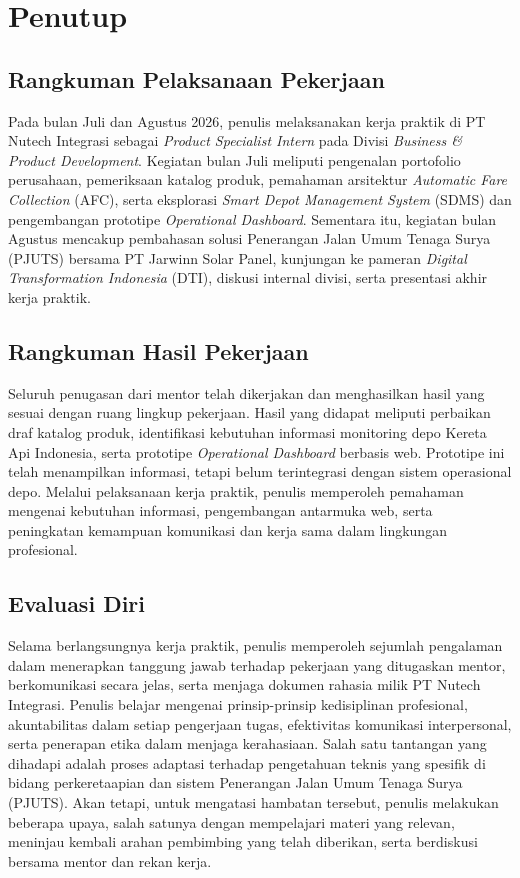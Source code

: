 \cleardoublepage
\chapter{Penutup}
\label{chap:penutup}

\section{Rangkuman Pelaksanaan Pekerjaan}
Pada bulan Juli dan Agustus 2026, penulis melaksanakan kerja praktik di PT Nutech Integrasi sebagai \textit{Product Specialist Intern} pada Divisi \textit{Business \& Product Development}. Kegiatan bulan Juli meliputi pengenalan portofolio perusahaan, pemeriksaan katalog produk, pemahaman arsitektur \textit{Automatic Fare Collection} (AFC), serta eksplorasi \textit{Smart Depot Management System} (SDMS) dan pengembangan prototipe \textit{Operational Dashboard}. Sementara itu, kegiatan bulan Agustus mencakup pembahasan solusi Penerangan Jalan Umum Tenaga Surya (PJUTS) bersama PT Jarwinn Solar Panel, kunjungan ke pameran \textit{Digital Transformation Indonesia} (DTI), diskusi internal divisi, serta presentasi akhir kerja praktik.

\section{Rangkuman Hasil Pekerjaan}
Seluruh penugasan dari mentor telah dikerjakan dan menghasilkan hasil yang sesuai dengan ruang lingkup pekerjaan. Hasil yang didapat meliputi perbaikan draf katalog produk, identifikasi kebutuhan informasi monitoring depo Kereta Api Indonesia, serta prototipe \textit{Operational Dashboard} berbasis web. Prototipe ini telah menampilkan informasi, tetapi belum terintegrasi dengan sistem operasional depo. Melalui pelaksanaan kerja praktik, penulis memperoleh pemahaman mengenai kebutuhan informasi, pengembangan antarmuka web, serta peningkatan kemampuan komunikasi dan kerja sama dalam lingkungan profesional.

\section{Evaluasi Diri}
Selama berlangsungnya kerja praktik, penulis memperoleh sejumlah pengalaman dalam menerapkan tanggung jawab terhadap pekerjaan yang ditugaskan mentor, berkomunikasi secara jelas, serta menjaga dokumen rahasia milik PT Nutech Integrasi. Penulis belajar mengenai prinsip-prinsip kedisiplinan profesional, akuntabilitas dalam setiap pengerjaan tugas, efektivitas komunikasi interpersonal, serta penerapan etika dalam menjaga kerahasiaan. Salah satu tantangan yang dihadapi adalah proses adaptasi terhadap pengetahuan teknis yang spesifik di bidang perkeretaapian dan sistem Penerangan Jalan Umum Tenaga Surya (PJUTS). Akan tetapi, untuk mengatasi hambatan tersebut, penulis melakukan beberapa upaya, salah satunya dengan mempelajari materi yang relevan, meninjau kembali arahan pembimbing yang telah diberikan, serta berdiskusi bersama mentor dan rekan kerja.

